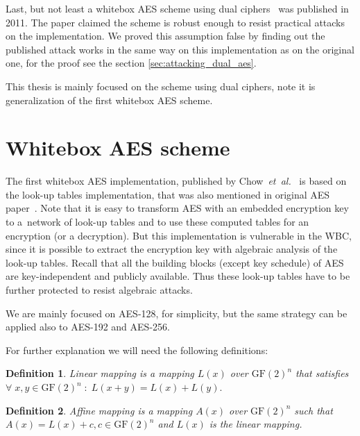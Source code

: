 \documentclass[11pt,oneside,final]{fithesis2}
\newtheorem{mydef}{Definition}
\newcommand{\eal}{\emph{et~al.}}
\begin{document}
    Last, but not least a whitebox AES scheme using dual ciphers~\citep{Karroumi:2010:PWA:2041036.2041060} was published in 2011. The paper claimed 
    the scheme is robust enough to resist practical attacks on the implementation. We proved this assumption false by finding out the published attack
    works in the same way on this implementation as on the original one, for the proof see the section \ref{sec:attacking_dual_aes}.
    
    This thesis is mainly focused on the scheme using dual ciphers, note it is generalization of the first whitebox AES scheme. 
    

    \section{Whitebox AES scheme}

    The first whitebox AES implementation, published by Chow~\eal~\citep{Chow02white-boxcryptography} is based on the look-up tables implementation, that was also
    mentioned in original AES paper~\citep{2002-daemen}. Note that it is easy to transform AES with an embedded encryption key 
    to a~network of look-up tables and to use these computed tables for an encryption (or a decryption). But this implementation is vulnerable in the WBC,
    since it is possible to extract the encryption key with algebraic analysis of the look-up tables. Recall that all the building blocks (except key schedule) of AES are key-independent 
    and publicly available. Thus these look-up tables have to be further protected to resist algebraic attacks. 
    
    We are mainly focused on AES-128, for simplicity, but the same strategy can be applied also to AES-192 and AES-256.

    For further explanation we will need the following definitions:

    \begin{mydef}\label{def:linear_mapping}
    Linear mapping is a mapping $L\left(x\right)$ over $\text{GF}(2)^n$ that satisfies $\forall \; x,y \in \text{GF}(2)^n \; : \; L(x+y) = L(x) + L(y).$
    \end{mydef}
    
    \begin{mydef}\label{def:affine_mapping}
    Affine mapping is a mapping $A(x)$ over $\text{GF}(2)^n$ such that $A(x) = L(x) + c, c \in \text{GF}(2)^n$ and $L(x)$ is the linear mapping.
    \end{mydef}
\end{document}
